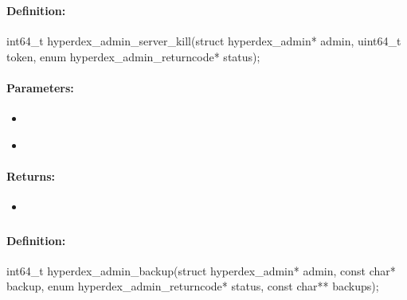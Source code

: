 \pagebreak
\subsubsection{}
\label{api:c:server_kill}


\paragraph{Definition:}
\begin{ccode}
int64_t hyperdex_admin_server_kill(struct hyperdex_admin* admin,
        uint64_t token,
        enum hyperdex_admin_returncode* status);
\end{ccode}

\paragraph{Parameters:}
\begin{itemize}[noitemsep]
\item {}\\

\item {}\\

\end{itemize}

\paragraph{Returns:}
\begin{itemize}[noitemsep]
\item {}\\

\end{itemize}

\pagebreak
\subsubsection{}
\label{api:c:backup}


\paragraph{Definition:}
\begin{ccode}
int64_t hyperdex_admin_backup(struct hyperdex_admin* admin,
        const char* backup,
        enum hyperdex_admin_returncode* status,
        const char** backups);
\end{ccode}

